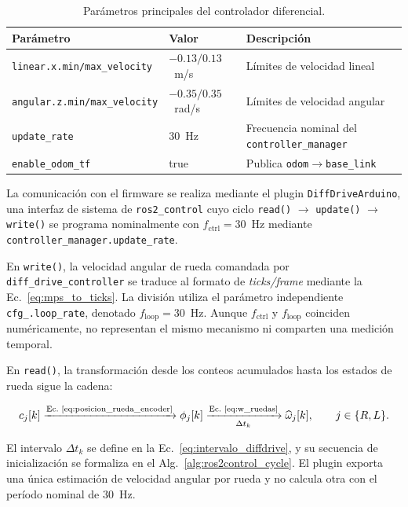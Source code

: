 \begin{table}[H]
\centering
\caption{Parámetros principales del controlador diferencial.}
\label{tab:diff_drive_params}
\small
\begin{tabular}{llp{5.6cm}}
\toprule
\textbf{Parámetro} & \textbf{Valor} & \textbf{Descripción} \\
\midrule
\texttt{linear.x.min/max\_velocity} & $-0.13/0.13$~m/s & Límites de velocidad lineal \\
\texttt{angular.z.min/max\_velocity} & $-0.35/0.35$~rad/s & Límites de velocidad angular \\
\texttt{update\_rate} & 30~Hz & Frecuencia nominal del \texttt{controller\_manager} \\
\texttt{enable\_odom\_tf} & true & Publica \texttt{odom}$\rightarrow$\texttt{base\_link} \\
\bottomrule
\end{tabular}
\end{table}

La comunicación con el firmware se realiza mediante el plugin \texttt{DiffDriveArduino}, una interfaz de sistema de \texttt{ros2\_control} cuyo ciclo \texttt{read()} $\rightarrow$ \texttt{update()} $\rightarrow$ \texttt{write()} se programa nominalmente con $f_{\mathrm{ctrl}}=30$~Hz mediante \texttt{controller\_manager.update\_rate}.

En \texttt{write()}, la velocidad angular de rueda comandada por \texttt{diff\_drive\_controller} se traduce al formato de \textit{ticks/frame} mediante la Ec.~\eqref{eq:mps_to_ticks}. La división utiliza el parámetro independiente \texttt{cfg\_.loop\_rate}, denotado $f_{\mathrm{loop}}=30$~Hz. Aunque $f_{\mathrm{ctrl}}$ y $f_{\mathrm{loop}}$ coinciden numéricamente, no representan el mismo mecanismo ni comparten una medición temporal.

En \texttt{read()}, la transformación desde los conteos acumulados hasta los estados de rueda sigue la cadena:

\begin{equation}
c_j[k]
\xrightarrow{\text{Ec.~\eqref{eq:posicion_rueda_encoder}}}
\phi_j[k]
\xrightarrow[\Delta t_k]{\text{Ec.~\eqref{eq:w_ruedas}}}
\widehat{\omega}_j[k],
\qquad j\in\{R,L\}.
\label{eq:enc_to_state}
\end{equation}

El intervalo $\Delta t_k$ se define en la Ec.~\eqref{eq:intervalo_diffdrive}, y su secuencia de inicialización se formaliza en el Alg.~\ref{alg:ros2control_cycle}. El plugin exporta una única estimación de velocidad angular por rueda y no calcula otra con el período nominal de 30~Hz.

